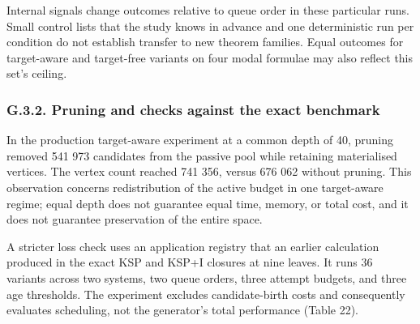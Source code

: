 \documentclass[pdflatex,sn-basic,Numbered]{sn-jnl}
\begin{document}
\endgroup

Internal signals change outcomes relative to queue order in these particular runs. Small control lists that the study knows in advance and one deterministic run per condition do not establish transfer to new theorem families. Equal outcomes for target-aware and target-free variants on four modal formulae may also reflect this set's ceiling.

\subsubsection*{G.3.2. Pruning and checks against the exact benchmark}\label{g.3.2.-pruning-and-checks-against-the-exact-benchmark}

In the production target-aware experiment at a common depth of 40, pruning removed 541 973 candidates from the passive pool while retaining materialised vertices. The vertex count reached 741 356, versus 676 062 without pruning. This observation concerns redistribution of the active budget in one target-aware regime; equal depth does not guarantee equal time, memory, or total cost, and it does not guarantee preservation of the entire space.

A stricter loss check uses an application registry that an earlier calculation produced in the exact KSP and KSP+I closures at nine leaves. It runs 36 variants across two systems, two queue orders, three attempt budgets, and three age thresholds. The experiment excludes candidate-birth costs and consequently evaluates scheduling, not the generator's total performance (Table 22).

\begingroup
\small
\setlength{\tabcolsep}{3pt}
\renewcommand{\arraystretch}{1.13}
\end{document}
